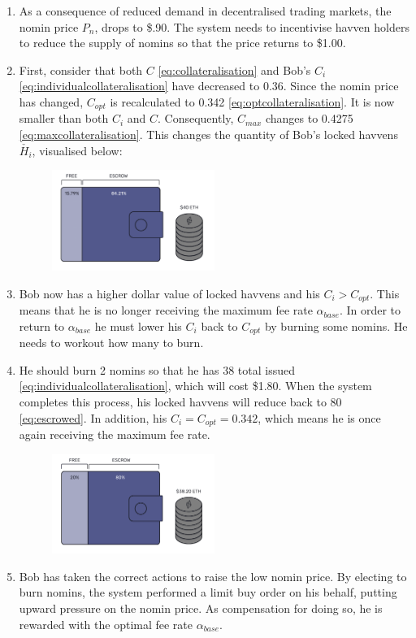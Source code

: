 \begin{enumerate}
\item{As a consequence of reduced demand in decentralised trading markets, the nomin price $P_n$, drops to \$.90. The system needs to incentivise havven holders to reduce the supply of nomins so that the price returns to \$1.00.}
\item{First, consider that both $C$ \eqref{eq:collateralisation} and Bob's $C_i$ \eqref{eq:individualcollateralisation} have decreased to 0.36. Since the nomin price has changed, $C_{opt}$ is recalculated to 0.342 \eqref{eq:optcollateralisation}. It is now smaller than both $C_i$ and $C$. Consequently, $C_{max}$ changes to 0.4275 \eqref{eq:maxcollateralisation}. This changes the quantity of Bob's locked havvens $\check{H_i}$, visualised below:}
\begin{figure}[h!]
\centering
     \includegraphics[width=0.5\textwidth]{img/pn_drop_new}
\end{figure}
\item{Bob now has a higher dollar value of locked havvens and his $C_i > C_{opt}$. This means that he is no longer receiving the maximum fee rate $\alpha_{base}$. In order to return to $\alpha_{base}$ he must lower his $C_i$ back to $C_{opt}$ by burning some nomins. He needs to workout how many to burn.}
\item{He should burn 2 nomins so that he has 38 total issued \eqref{eq:individualcollateralisation}, which will cost \$1.80. When the system completes this process, his locked havvens will reduce back to 80 \eqref{eq:escrowed}. In addition, his $C_i = C_{opt} = 0.342 $, which means he is once again receiving the maximum fee rate.}
\begin{figure}[h!]
\centering
      \includegraphics[width=0.5\textwidth]{img/post_burn_new}
\end{figure}
\item{Bob has taken the correct actions to raise the low nomin price. By electing to burn nomins, the system performed a limit buy order on his behalf, putting upward pressure on the nomin price. As compensation for doing so, he is rewarded with the optimal fee rate $\alpha_{base}$.}
\end{enumerate}

